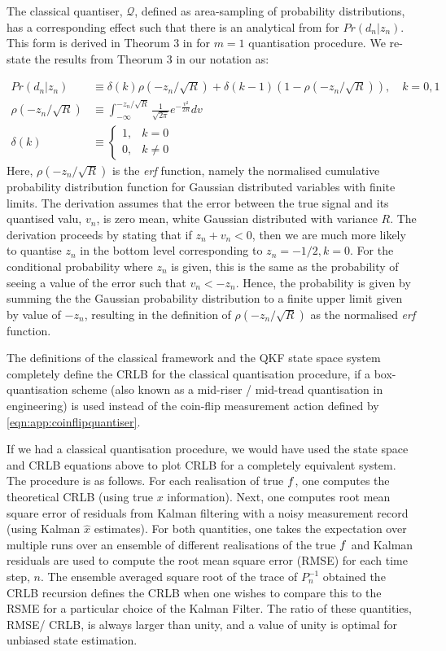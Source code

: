The classical quantiser, $\mathcal{Q}$, defined as area-sampling of probability distributions, has a corresponding effect such that there is an analytical from for $Pr(d_n|z_n)$. This form is derived in Theorum 3 in \cite{karlsson2005} for $m=1$ quantisation procedure. We re-state the results from Theorum 3 in our notation as:

\begin{align}
Pr(d_n| z_n) & \equiv \delta(k) \rho(-z_n/ \sqrt{R}) + \delta(k-1) (1- \rho(-z_n/ \sqrt{R})), \quad k = 0, 1 \label{eqn:app:classicalquantiser}\\
\rho(-z_n/ \sqrt{R}) & \equiv \int_{-\infty}^{-z_n/ \sqrt{R}} \frac{1}{\sqrt{2\pi}} e^{-\frac{v^2}{2 R}} dv \\
\delta(k) &\equiv \begin{cases} 1, &k=0 \\ 0, &k \neq 0 \end{cases}
\end{align}
Here, $\rho(-z_n/ \sqrt{R})$ is the \emph{erf} function, namely the normalised cumulative probability distribution function for Gaussian distributed variables with finite limits. The derivation assumes that the error  between the true signal and its quantised valu, $v_n$, is zero mean, white Gaussian distributed with variance $R$. The derivation proceeds by stating that if $z_n + v_n < 0$, then we are much more likely to quantise $z_n$ in the bottom level corresponding to $z_n = -1/2, k = 0$. For the conditional probability where $z_n$ is given, this is the same as the probability of seeing a value of the error such that $v_n < -z_n$.  Hence, the probability is given by summing the the Gaussian probability distribution to a finite upper limit given by value of $-z_n$, resulting in the definition of $\rho(-z_n/ \sqrt{R})$ as the normalised \emph{erf} function.

The definitions of the classical framework and the QKF state space system completely define the CRLB for the classical quantisation procedure, if a box-quantisation scheme (also known as a mid-riser / mid-tread quantisation in engineering) is used instead of the coin-flip measurement action defined by \cref{eqn:app:coinflipquantiser}. 

If we had a classical quantisation procedure, we would have used the state space and CRLB equations above to plot CRLB for a completely equivalent system. The procedure is as follows. For each realisation of true $f$, one computes the theoretical CRLB (using true $x$ information).  Next, one computes root mean square error of residuals from Kalman filtering with a noisy measurement record (using Kalman $\hat{x}$ estimates). For both quantities, one takes the expectation over multiple runs over an ensemble of different realisations of the true $f$ and Kalman residuals are used to compute the root mean square error (RMSE) for each time step, $n$. The ensemble averaged square root of the trace of $P_n^{-1}$ obtained the CRLB recursion defines the CRLB when one wishes to compare this to the RSME for a particular choice of the Kalman Filter. The ratio of these quantities, RMSE/ CRLB, is always larger than unity, and a value of unity is optimal for unbiased state estimation.

